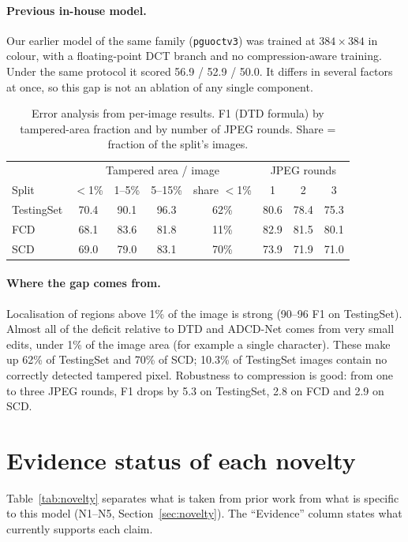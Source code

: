 \documentclass[10pt,a4paper]{article}
\begin{document}
\paragraph{Previous in-house model.} Our earlier model of the same family
(\texttt{pguoctv3}) was trained at $384\times384$ in colour, with a floating-point DCT
branch and no compression-aware training. Under the same protocol it scored
56.9 / 52.9 / 50.0. It differs in several factors at once, so this gap is not an ablation of
any single component.

\begin{table}[!htbp]
\centering
\caption{Error analysis from per-image results. F1 (DTD formula) by tampered-area fraction
and by number of JPEG rounds. Share = fraction of the split's images.}
\label{tab:breakdown}
\begin{tabular}{@{}lcccc|ccc@{}}
\toprule
 & \multicolumn{4}{c|}{Tampered area / image} & \multicolumn{3}{c}{JPEG rounds} \\
Split & $<$1\% & 1--5\% & 5--15\% & share $<$1\% & 1 & 2 & 3 \\
\midrule
TestingSet & 70.4 & 90.1 & 96.3 & 62\% & 80.6 & 78.4 & 75.3 \\
FCD        & 68.1 & 83.6 & 81.8 & 11\% & 82.9 & 81.5 & 80.1 \\
SCD        & 69.0 & 79.0 & 83.1 & 70\% & 73.9 & 71.9 & 71.0 \\
\bottomrule
\end{tabular}
\end{table}

\paragraph{Where the gap comes from.} Localisation of regions above 1\% of the image is
strong (90--96 F1 on TestingSet). Almost all of the deficit relative to DTD and ADCD-Net
comes from very small edits, under 1\% of the image area (for example a single character).
These make up 62\% of TestingSet and 70\% of SCD; 10.3\% of TestingSet images contain no
correctly detected tampered pixel. Robustness to compression is good: from one to three
JPEG rounds, F1 drops by 5.3 on TestingSet, 2.8 on FCD and 2.9 on SCD.

\section{Evidence status of each novelty}\label{sec:prov}
Table~\ref{tab:novelty} separates what is taken from prior work from what is specific to
this model (N1--N5, Section~\ref{sec:novelty}). The ``Evidence'' column states what
currently supports each claim.
\end{document}
